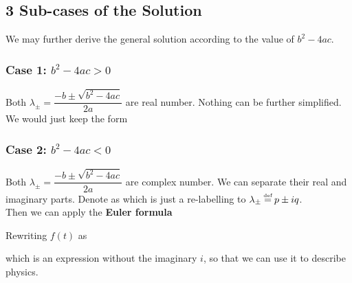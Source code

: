 \documentclass[class=article, crop=false, 12pt]{standalone}
\begin{document}
\subsection{3 Sub-cases of the Solution}

We may further derive the general solution according to the value of $b^2-4ac$.

\subsubsection{Case 1: $b^2-4ac>0$}

Both $\lambda_\pm = \dfrac{-b\pm\sqrt{b^2-4ac}}{2a}$ are real number. 
Nothing can be further simplified. 
We would just keep the form

\subsubsection{Case 2: $b^2-4ac<0$}

Both $\lambda_\pm = \dfrac{-b\pm\sqrt{b^2-4ac}}{2a}$ are complex number.
We can separate their real and imaginary parts. Denote as
which is just a re-labelling to $\lambda_\pm \defeq p\pm iq$. \\

Then we can apply the \bf{Euler formula}

Rewriting $f(t)$ as 

which is an expression without the imaginary $i$, 
so that we can use it to describe physics. \\
\end{document}
